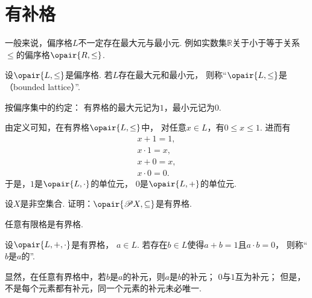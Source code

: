 \section{有补格}
一般来说，偏序格\(L\)不一定存在最大元与最小元.
例如实数集\(\mathbb{R}\)关于小于等于关系\(\leq\)的偏序格\(\opair{R,\leq}\).

\begin{definition}
设\(\opair{L,\leq}\)是偏序格.
若\(L\)存在最大元和最小元，
则称“\(\opair{L,\leq}\)是（bounded lattice）”.
\end{definition}

按偏序集中的约定：
有界格的最大元记为\(1\)，最小元记为\(0\).

由定义可知，在有界格\(\opair{L,\leq}\)中，
对任意\(x \in L\)，有\(0 \leq x \leq 1\).
进而有\begin{gather*}
	x + 1 = 1, \\
	x \cdot 1 = x, \\
	x + 0 = x, \\
	x \cdot 0 = 0.
\end{gather*}
于是，\(1\)是\(\opair{L,\cdot}\)的单位元，
\(0\)是\(\opair{L,+}\)的单位元.

\begin{example}
设\(X\)是非空集合.
证明：\(\opair{\Powerset X,\subseteq}\)是有界格.
\end{example}

\begin{proposition}
任意有限格是有界格.
\end{proposition}

\begin{definition}
设\(\opair{L,+,\cdot}\)是有界格，
\(a \in L\).
若存在\(b \in L\)使得\(a + b = 1\)且\(a \cdot b = 0\)，
则称“\(b\)是\(a\)的”.
\end{definition}

显然，在任意有界格中，若\(b\)是\(a\)的补元，则\(a\)是\(b\)的补元；
\(0\)与\(1\)互为补元；
但是，不是每个元素都有补元，同一个元素的补元未必唯一.

